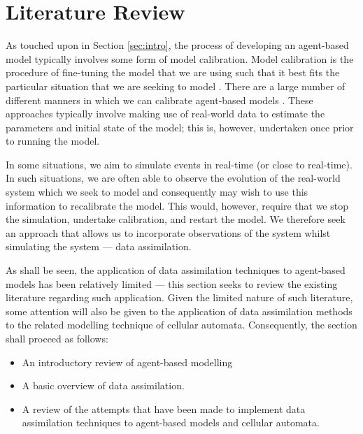 \section{Literature Review}\label{sec:lit_rev}


As touched upon in Section \ref{sec:intro}, the process of developing an
agent-based model typically involves some form of model calibration.
Model calibration is the procedure of fine-tuning the model that we are using
such that it best fits the particular situation that we are seeking to model
\citep{crooks2012introduction}.
There are a large number of different manners in which we can calibrate
agent-based models \citep{thiele2014facilitating}.
These approaches typically involve making use of real-world data to estimate the
parameters and initial state of the model; this is, however, undertaken once
prior to running the model.

In some situations, we aim to simulate events in real-time (or close to
real-time).
In such situations, we are often able to observe the evolution of
the real-world system which we seek to model and consequently may wish to use
this information to recalibrate the model.
This would, however, require that we stop the simulation, undertake calibration,
and restart the model.
We therefore seek an approach that allows us to incorporate observations of the
system whilst simulating the system --- data assimilation.

As shall be seen, the application of data assimilation techniques to agent-based
models has been relatively limited --- this section seeks to review the existing
literature regarding such application.
Given the limited nature of such literature, some attention will also be given
to the application of data assimilation methods to the related modelling
technique of cellular automata.
Consequently, the section shall proceed as follows:
\begin{itemize}
    \item An introductory review of agent-based modelling
    \item A basic overview of data assimilation.
    \item A review of the attempts that have been made to implement data
        assimilation techniques to agent-based models and cellular automata.
\end{itemize}

